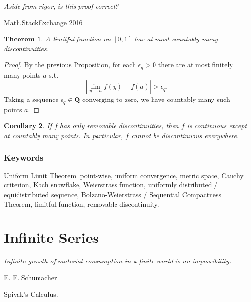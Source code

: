 \documentclass[12pt]{article}
\theoremstyle{plain}
\newtheorem{theorem}{Theorem}
\newtheorem{corollary}[theorem]{Corollary}
\theoremstyle{definition}
\theoremstyle{remark}
\newcommand{\Q}{\mathbf Q}
\begin{document}
\epigraph{\textit{Aside from rigor, is this proof correct?}}{Math.StackExchange 2016}

\begin{theorem}
A limitful function on $[0, 1]$ has at most countably many discontinuities.
\end{theorem}

\begin{proof}
By the previous Proposition, for each $\epsilon_q > 0$ there are at most finitely many points $a$ s.t. $$|\lim\limits_{y\to a} f(y) - f(a)| > \epsilon_q.$$ Taking a sequence $\epsilon_q \in \Q$ converging to zero, we have countably many such points $a$.
\end{proof}

\begin{corollary}
If $f$ has only removable discontinuities, then $f$ is continuous except at countably many points. In particular, $f$ cannot be discontinuous everywhere.
\end{corollary}

\section{Keywords}

Uniform Limit Theorem, point-wise, uniform convergence, metric space, Cauchy criterion, Koch snowflake, Weierstrass function, uniformly distributed / equidistributed sequence, Bolzano-Weierstrass / Sequential Compactness Theorem, limitful function, removable discontinuity.

\part{Infinite Series}

\epigraph{\textit{Infinite growth of material consumption in a finite world is an impossibility.}}{E. F. Schumacher}

\begin{thebibliography}{99}

 Spivak's Calculus.

\end{thebibliography}
\end{document}

